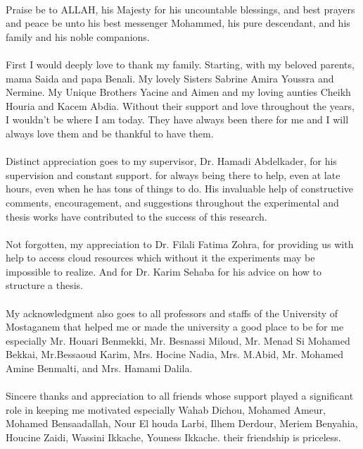 \paragraph{}
Praise be to ALLAH, his Majesty for his uncountable blessings, and best prayers and peace be unto his best messenger Mohammed, his pure descendant, and his family and his noble companions.
\paragraph{}
First I would deeply love to thank my family. Starting, with my beloved parents, mama Saida and papa Benali. My lovely Sisters Sabrine Amira Youssra and Nermine. My Unique Brothers Yacine and  Aimen and my loving aunties Cheikh Houria and Kacem Abdia. Without their support and love throughout the years, I wouldn't be where I am today. They have always been there for me and I will always love them and be thankful to have them. 
\paragraph{}
Distinct appreciation goes to my supervisor, Dr. Hamadi Abdelkader, for his supervision and constant support. for always being there to help, even at late hours, even when he has tons of things to do. His invaluable help of constructive comments, encouragement, and suggestions throughout the experimental and thesis works have contributed to the success of this research.
\paragraph{}
Not forgotten, my appreciation to Dr. Filali Fatima Zohra, for providing us with help to access cloud resources which without it the experiments may be impossible to realize. And for Dr. Karim Sehaba for his advice on how to structure a thesis. 
\paragraph{}
My acknowledgment also goes to all professors and staffs of the University of Mostaganem that helped me or made the university a good place to be for me especially Mr. Houari Benmekki, Mr. Besnassi Miloud, Mr. Menad Si Mohamed Bekkai, Mr.Bessaoud Karim, Mrs. Hocine Nadia, Mrs. M.Abid, Mr. Mohamed Amine Benmalti, and Mrs. Hamami Dalila.
\paragraph{}
Sincere thanks and appreciation to all friends whose support played a significant role in keeping me motivated especially Wahab Dichou, Mohamed Ameur, Mohamed Bensaadallah, Nour El houda Larbi, Ilhem Derdour, Meriem Benyahia, Houcine Zaidi, Wassini Ikkache, Youness Ikkache. their friendship is priceless.
